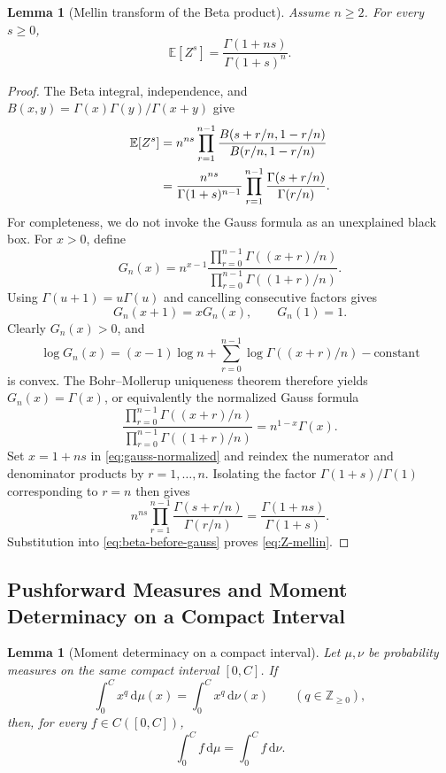 \documentclass[11pt,a4paper]{article}
\newtheorem{lemma}[theorem]{Lemma}
\theoremstyle{definition}
\newcommand{\E}{\mathbb E}
\newcommand{\dd}{\,\mathrm d}
\begin{document}
\begin{lemma}[Mellin transform of the Beta product]
\label{lem:beta-mellin}
Assume $n\ge2$. For every $s\ge0$,
\begin{equation}\label{eq:Z-mellin}
\E[Z^s]=\frac{\Gamma(1+ns)}{\Gamma(1+s)^n}.
\end{equation}
\end{lemma}

\begin{proof}
The Beta integral, independence, and
$B(x,y)=\Gamma(x)\Gamma(y)/\Gamma(x+y)$ give
\begin{align}
\E[Z^s]
&=n^{ns}\prod_{r=1}^{n-1}
\frac{B(s+r/n,1-r/n)}{B(r/n,1-r/n)}\notag\\
&=\frac{n^{ns}}{\Gamma(1+s)^{n-1}}
\prod_{r=1}^{n-1}
\frac{\Gamma(s+r/n)}{\Gamma(r/n)}.
\label{eq:beta-before-gauss}
\end{align}
For completeness, we do not invoke the Gauss formula as an unexplained
black box. For $x>0$, define
\[
G_n(x)=n^{x-1}
\frac{\prod_{r=0}^{n-1}\Gamma((x+r)/n)}
{\prod_{r=0}^{n-1}\Gamma((1+r)/n)}.
\]
Using $\Gamma(u+1)=u\Gamma(u)$ and cancelling consecutive factors gives
\[
 G_n(x+1)=xG_n(x),\qquad G_n(1)=1.
\]
Clearly $G_n(x)>0$, and
\[
\log G_n(x)
=(x-1)\log n+\sum_{r=0}^{n-1}\log\Gamma((x+r)/n)-\text{constant}
\]
is convex. The Bohr--Mollerup uniqueness theorem
\cite[pp.~34--36]{Andrews1999} therefore yields
$G_n(x)=\Gamma(x)$, or equivalently the normalized Gauss formula
\begin{equation}\label{eq:gauss-normalized}
\frac{\prod_{r=0}^{n-1}\Gamma((x+r)/n)}
{\prod_{r=0}^{n-1}\Gamma((1+r)/n)}
=n^{1-x}\Gamma(x).
\end{equation}
Set $x=1+ns$ in \eqref{eq:gauss-normalized} and reindex the numerator
and denominator products by $r=1,\ldots,n$. Isolating the factor
$\Gamma(1+s)/\Gamma(1)$ corresponding to $r=n$ then gives
\[
n^{ns}\prod_{r=1}^{n-1}
\frac{\Gamma(s+r/n)}{\Gamma(r/n)}
=\frac{\Gamma(1+ns)}{\Gamma(1+s)}.
\]
Substitution into \eqref{eq:beta-before-gauss} proves
\eqref{eq:Z-mellin}.
\end{proof}

\subsection{Pushforward Measures and Moment Determinacy on a Compact Interval}

\begin{lemma}[Moment determinacy on a compact interval]
\label{lem:moment-unique}
Let $\mu,\nu$ be probability measures on the same compact interval
$[0,C]$. If
\[
 \int_0^C x^q\dd\mu(x)=\int_0^C x^q\dd\nu(x)
 \qquad(q\in\mathbb Z_{\ge0}),
\]
then, for every $f\in C([0,C])$,
\[
 \int_0^C f\dd\mu=\int_0^C f\dd\nu.
\]
\end{lemma}
\end{document}
